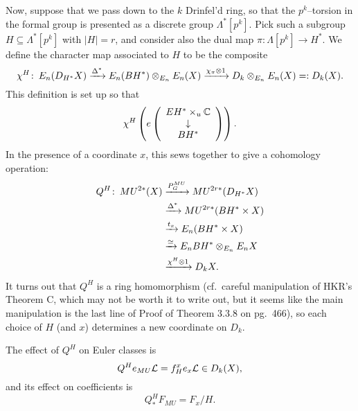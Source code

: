 

Now, suppose that we pass down to the $k${\th} Drinfel'd ring, so that the $p^k$--torsion in the formal group is presented as a discrete group $\Lambda^*[p^k]$.  Pick such a subgroup $H \subseteq \Lambda^*[p^k]$ with $|H| = r$, and consider also the dual map $\pi: \Lambda[p^k] \to H^*$.  We define the character map associated to $H$ to be the composite \[\chi^H \colon\thinspace E_n(D_{H^*} X) \xrightarrow{\Delta^*} E_n(BH^*) \otimes_{E_n} E_n(X) \xrightarrow{\chi_\pi \otimes 1} D_k \otimes_{E_n} E_n(X) =: D_k(X).\]  This definition is set up so that \[\chi^H \left( e \left( \begin{array}{c} EH^* \times_u \mathbb{C} \\ \downarrow \\ BH^* \end{array} \right) \right).\]  In the presence of a coordinate $x$, this sews together to give a cohomology operation:
\begin{align*}
Q^H \colon\thinspace MU^{2*}(X) & \xrightarrow{P^{MU}_G} MU^{2r*}(D_{H^*} X) \\
& \xrightarrow{\Delta^*} MU^{2r*}(BH^* \times X) \\
& \xrightarrow{t_x} E_n(BH^* \times X) \\
& \xrightarrow{\simeq} E_n BH^* \otimes_{E_n} E_n X \\
& \xrightarrow{\chi^H \otimes 1} D_k X.
\end{align*}
It turns out that $Q^H$ is a ring homomorphism (cf.\ careful manipulation of HKR's Theorem C, which may not be worth it to write out, but it seems like the main manipulation is the last line of Proof of Theorem 3.3.8 on pg.\ 466), so each choice of $H$ (and $x$) determines a new coordinate on $D_k$.
\begin{theorem}
The effect of $Q^H$ on Euler classes is \[Q^H e_{MU} \mathcal{L} = f_H^x e_x \mathcal{L} \in D_k(X),\] and its effect on coefficients is \[Q^H_* F_{MU} = F_x / H.\]
\end{theorem}
